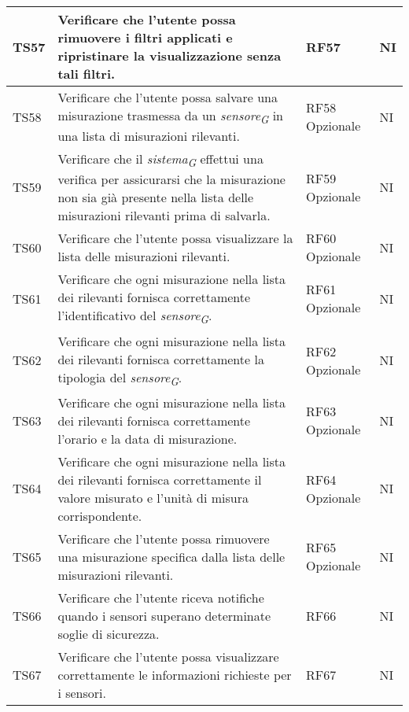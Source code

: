 \begin{longtable}{|C{1.9cm}|L{5cm}|C{2cm}|C{2cm}|}
    TS57 & Verificare che l'utente possa rimuovere i filtri applicati e ripristinare la visualizzazione senza tali filtri. & RF57 & NI \\
    \hline

    TS58 & Verificare che l'utente possa salvare una misurazione trasmessa da un \textit{sensore}\textsubscript{\textit{G}} in una lista di misurazioni rilevanti. & RF58 Opzionale & NI \\
    \hline

    TS59 & Verificare che il \textit{sistema}\textsubscript{\textit{G}} effettui una verifica per assicurarsi che la misurazione non sia già presente nella lista delle misurazioni rilevanti prima di salvarla. & RF59 Opzionale & NI \\
    \hline

    TS60 & Verificare che l'utente possa visualizzare la lista delle misurazioni rilevanti. & RF60 Opzionale & NI \\
    \hline

    TS61 & Verificare che ogni misurazione nella lista dei rilevanti fornisca correttamente l'identificativo del \textit{sensore}\textsubscript{\textit{G}}. & RF61 Opzionale & NI \\
    \hline

    TS62 & Verificare che ogni misurazione nella lista dei rilevanti fornisca correttamente la tipologia del \textit{sensore}\textsubscript{\textit{G}}. & RF62 Opzionale & NI \\
    \hline

    TS63 & Verificare che ogni misurazione nella lista dei rilevanti fornisca correttamente l'orario e la data di misurazione. & RF63 Opzionale & NI \\
    \hline

    TS64 & Verificare che ogni misurazione nella lista dei rilevanti fornisca correttamente il valore misurato e l'unità di misura corrispondente. & RF64 Opzionale & NI \\
    \hline

    TS65 & Verificare che l'utente possa rimuovere una misurazione specifica dalla lista delle misurazioni rilevanti. & RF65 Opzionale & NI \\
    \hline

    TS66 & Verificare che l'utente riceva notifiche quando i sensori superano determinate soglie di sicurezza. & RF66 & NI \\
    \hline

    TS67 & Verificare che l'utente possa visualizzare correttamente le informazioni richieste per i sensori. & RF67 & NI \\
    \hline


\end{longtable}
